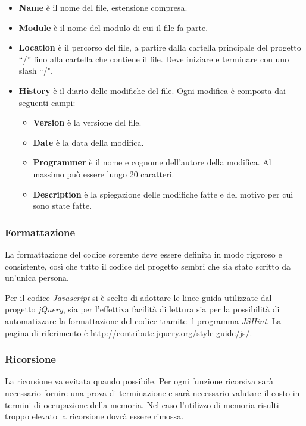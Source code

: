 \begin{itemize}
 \item \textbf{Name} è il nome del file, estensione compresa.
 \item \textbf{Module} è il nome del modulo di cui il file fa parte.
 \item \textbf{Location} è il percorso del file, a partire dalla cartella principale del progetto ``/'' fino alla cartella che contiene il file. Deve iniziare e terminare con uno slash ``/".
 \item \textbf{History} è il diario delle modifiche del file. Ogni modifica è composta dai seguenti campi:
 
    \begin{itemize}
     \item \textbf{Version} è la versione del file.
     \item \textbf{Date} è la data della modifica.
     \item \textbf{Programmer} è il nome e cognome dell'autore della modifica. Al massimo può essere lungo 20 caratteri.
     \item \textbf{Description} è la spiegazione delle modifiche fatte e del motivo per cui sono state fatte.    
    \end{itemize}
\end{itemize}

\subsubsection{Formattazione}
\label{formattazione}

La formattazione del codice sorgente deve essere definita in modo rigoroso e consistente, così che tutto il codice del progetto sembri che sia stato scritto da un'unica persona.

Per il codice \emph{Javascript} si è scelto di adottare le linee guida utilizzate dal progetto \emph{jQuery}, sia per l'effettiva facilità di lettura sia per la possibilità di automatizzare la formattazione del codice tramite il programma \emph{JSHint}. La pagina di riferimento è \url{http://contribute.jquery.org/style-guide/js/}.

\subsubsection{Ricorsione}
La ricorsione va evitata quando possibile. Per ogni funzione ricorsiva sarà necessario fornire una prova di terminazione e sarà necessario valutare il costo in termini di occupazione della memoria. Nel caso l’utilizzo di memoria risulti troppo elevato la ricorsione dovrà essere rimossa.


